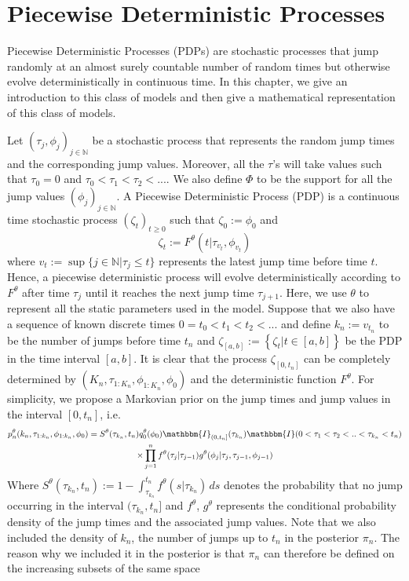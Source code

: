 \documentclass[12pt,a4paper]{article}
\begin{document}
\section{Piecewise Deterministic Processes}
Piecewise Deterministic Processes (PDPs) are stochastic processes that jump randomly at an almost surely countable number of random times but otherwise evolve deterministically in continuous time. In this chapter, we give an introduction to this class of models and then give a mathematical representation of this class of models.

Let $(\tau_j,\phi_j)_{j \in \mathbb{N}}$ be a stochastic process that represents the random jump times and the corresponding jump values. Moreover, all the $\tau$'s will take values such that $\tau_0 = 0$ and $\tau_0<\tau_1<\tau_2<...$. We also define $\Phi$ to be the support for all the jump values $(\phi_j)_{j \in \mathbb{N}}$. A Piecewise Deterministic Process (PDP) is a continuous time stochastic process $(\zeta_t)_{t \geq 0}$ such that $\zeta_0 := \phi_0$ and 
$$\zeta_t := F^{\theta}(t|\tau_{v_t},\phi_{v_t})$$
where $v_t := \sup \{j \in \mathbb{N}|\tau_j \leq t \}$ represents the latest jump time before time $t$. Hence, a piecewise deterministic process will evolve deterministically according to $F^{\theta}$ after time $\tau_{j}$ until it reaches the next jump time $\tau_{j+1}$. Here, we use $\theta$ to represent all the static parameters used in the model. Suppose that we also have a sequence of known discrete times $0=t_0<t_1<t_2<...$ and define $k_n := v_{t_n}$ to be the number of jumps before time $t_n$  and \(\zeta_{[a,b]} := \left\{\zeta_t| t \in [a,b]\right\}\) be the PDP in the time interval \([a,b]\). It is clear that the process $\zeta_{[0,t_n]}$ can be completely determined by $\left(K_n,\tau_{1:K_n},\phi_{1:K_n},\phi_0\right)$ and the deterministic function \(F^{\theta}\). For simplicity, we propose a Markovian prior on the jump times and jump values in the interval $[0,t_n]$, i.e.
\begin{multline}
\label{eqn:Chap1-PDMP-Prior}
    p_n^{\theta}(k_n,\tau_{1:k_n},\phi_{1:k_n},\phi_0) = S^{\theta}(\tau_{k_n},t_n)q_0^{\theta}(\phi_0)\mathbbm{I}_{(0,t_n]}(\tau_{k_n})\mathbbm{I}(0 < \tau_1 < \tau_2 <.. <\tau_{k_n} < t_n)\\
    \times \prod_{j=1}^{n} f^{\theta}(\tau_j|\tau_{j-1}) g^{\theta}(\phi_j|\tau_j,\tau_{j-1},\phi_{j-1})
\end{multline}
Where \(S^{\theta}(\tau_{k_n},t_n):= 1- \int_{\tau_{k_n}}^{t_n} f^{\theta}(s|\tau_{k_n})\,ds\) denotes the probability that no jump occurring in the interval $(\tau_{k_n},t_n]$ and $f^{\theta}$, $g^{\theta}$ represents the conditional probability density of the jump times and the associated jump values. Note that we also included the density of $k_n$, the number of jumps up to $t_n$ in the posterior $\pi_n$. The reason why we included it in the posterior is that $\pi_n$ can therefore be defined on the increasing subsets of the same space 
\end{document}
